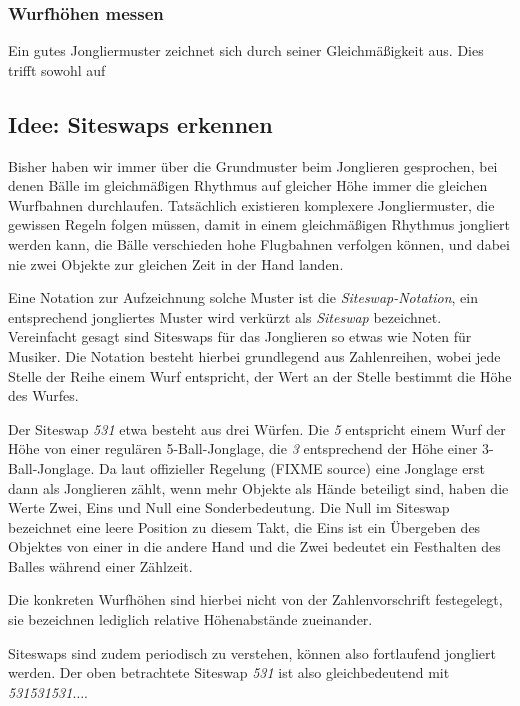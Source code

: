 \documentclass[12pt,a4paper,ngerman]{scrartcl}
\begin{document}
\subsubsection{Wurfhöhen messen}

Ein gutes Jongliermuster zeichnet sich durch seiner Gleichmäßigkeit aus. Dies trifft 
sowohl auf  

\subsection{Idee: Siteswaps erkennen}

Bisher haben wir immer über die Grundmuster beim Jonglieren gesprochen, bei denen
Bälle im gleichmäßigen Rhythmus auf gleicher Höhe immer die gleichen Wurfbahnen 
durchlaufen. Tatsächlich existieren komplexere Jongliermuster, die gewissen Regeln 
folgen müssen, damit in einem gleichmäßigen Rhythmus jongliert werden kann, die Bälle 
verschieden hohe Flugbahnen verfolgen können, und dabei nie zwei Objekte zur gleichen
Zeit in der Hand landen.

Eine Notation zur Aufzeichnung solche Muster ist die \textit{Siteswap-Notation}, ein
entsprechend jongliertes Muster wird verkürzt als \textit{Siteswap} bezeichnet. 
Vereinfacht gesagt sind Siteswaps für das Jonglieren so etwas wie Noten für Musiker.
Die Notation besteht hierbei grundlegend aus Zahlenreihen, wobei jede Stelle der
Reihe einem Wurf entspricht, der Wert an der Stelle bestimmt die Höhe des Wurfes. 

Der Siteswap \textit{531} etwa besteht aus drei Würfen. Die \textit{5} entspricht 
einem Wurf der Höhe von einer regulären 5-Ball-Jonglage, die \textit{3} entsprechend 
der Höhe einer 3-Ball-Jonglage. Da laut offizieller Regelung (FIXME source) eine 
Jonglage erst dann als Jonglieren zählt, wenn mehr Objekte als Hände beteiligt sind, 
haben die Werte Zwei, Eins und Null eine Sonderbedeutung. Die Null im Siteswap 
bezeichnet eine leere Position zu diesem Takt, die Eins ist ein Übergeben des 
Objektes von einer in die andere Hand und die Zwei bedeutet ein Festhalten des Balles
während einer Zählzeit.

Die konkreten Wurfhöhen sind hierbei nicht von der Zahlenvorschrift festegelegt, sie 
bezeichnen lediglich relative Höhenabstände zueinander. 

Siteswaps sind zudem periodisch zu verstehen, können also fortlaufend jongliert 
werden. Der oben betrachtete Siteswap \textit{531} ist also gleichbedeutend mit 
\textit{531531531$\dots$}.
\end{document}
